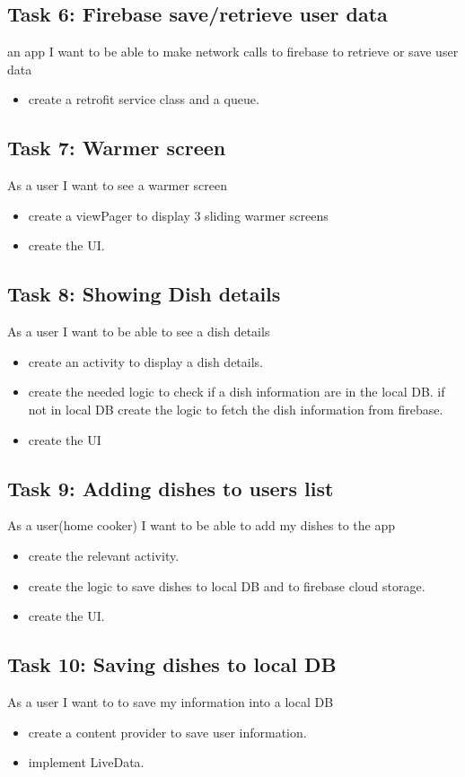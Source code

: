 \documentclass{article}
\begin{document}
\subsection{Task 6: Firebase save/retrieve user data}
an app I want to be able to make network calls to firebase to retrieve or save user data 
\begin{itemize} 
  \item create a retrofit service class and a queue.
\end{itemize}

\subsection{Task 7: Warmer screen}
	As a user I want to see a warmer screen
  \begin{itemize}
    \item create a viewPager to display 3 sliding warmer screens
    \item create the UI.
  \end{itemize}

\subsection{Task 8: Showing Dish details}
	As a user I want to be able to see a dish details 
  \begin{itemize}
    \item create an activity to display a dish details.
    \item create the needed logic to check if a dish information are in the local DB. if not in local    DB create the logic to fetch the dish information from firebase.
    \item create the UI
  \end{itemize}

\subsection{Task 9: Adding dishes to users list}
	As a user(home cooker) I want to be able to add my dishes to the app
  \begin{itemize}
	  \item create the relevant activity.
    \item create the logic to save dishes to local DB and to firebase cloud storage.
    \item create the UI.
  \end{itemize}

\subsection{Task 10: Saving dishes to local DB}
	As a user I want to to save my information into a local DB
  \begin{itemize}
    \item create a content provider to save user information.
    \item implement LiveData.
  \end{itemize}
\end{document}
